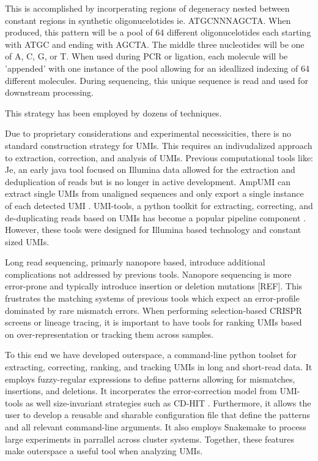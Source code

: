 \documentclass[9pt,twocolumn,twoside]{extarticle}
\begin{document}
This is accomplished by incorperating regions of degeneracy nested between constant regions in synthetic oligonucelotides ie. ATGCNNNAGCTA.
When produced, this pattern will be a pool of 64 different oligonucelotides each starting with ATGC and ending with AGCTA.
The middle three nucleotides will be one of A, C, G, or T.
When used during PCR or ligation, each molecule will be 'appended' with one instance of the pool allowing for an ideallized indexing of 64 different molecules.
During sequencing, this unique sequence is read and used for downstream processing.

This strategy has been employed by dozens of techniques.

Due to proprietary considerations and experimental necessicities, there is no standard construction strategy for UMIs.
This requires an indivudalized approach to extraction, correction, and analysis of UMIs.
Previous computational tools like:
Je, an early java tool focused on Illumina data allowed for the extraction and deduplication of reads \cite{girardot2016je} but is no longer in active development.
AmpUMI can extract single UMIs from unaligned sequences and only export a single instance of each detected UMI \cite{clement2018ampumi}.
UMI-tools, a python toolkit for extracting, correcting, and de-duplicating reads based on UMIs has become a popular pipeline component \cite{smith2017umitools}.
However, these tools were designed for Illumina based technology and constant sized UMIs.

Long read sequencing, primarly nanopore based, introduce additional complications not addressed by previous tools.
Nanopore sequencing is more error-prone and typically introduce insertion or deletion mutations [REF].
This frustrates the matching systems of previous tools which expect an error-profile dominated by rare mismatch errors.
When performing selection-based CRISPR screens or lineage tracing, it is important to have tools for ranking UMIs based on over-representation or tracking them across samples.

To this end we have developed outerspace, a command-line python toolset for extracting, correcting, ranking, and tracking UMIs in long and short-read data.
It employs fuzzy-regular expressions to define patterns allowing for mismatches, insertions, and deletions.
It incorperates the error-correction model from UMI-tools as well size-invariant strategies such as CD-HIT \cite{li2006cdhit}. %
Furthermore, it allows the user to develop a reusable and sharable configuration file that define the patterns and all relevant command-line arguments.
It also employs Snakemake to process large experiments in parrallel across cluster systems.
Together, these features make outerspace a useful tool when analyzing UMIs.
\end{document}
